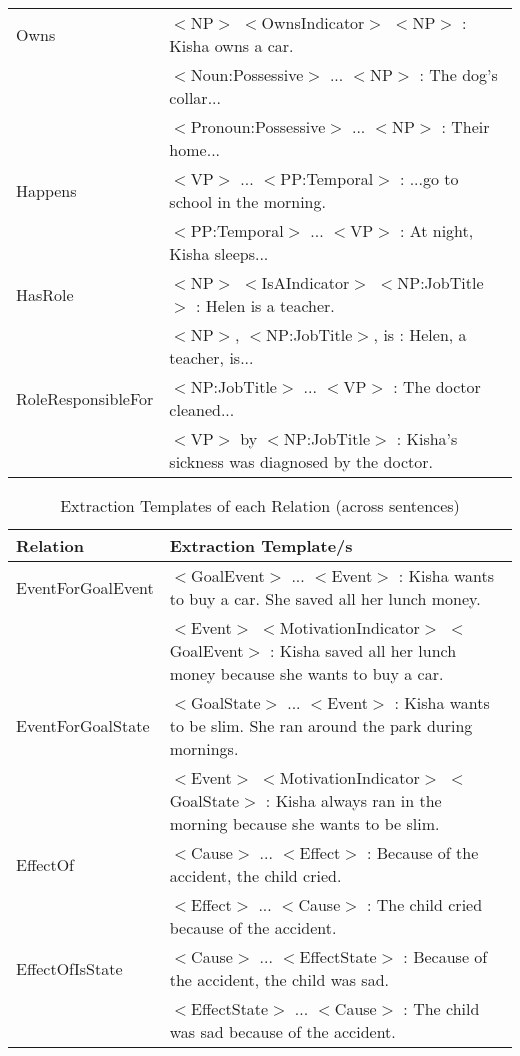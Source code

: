 \begin{table}[H]
\begin{tabular}{|p{3.5cm}|p{10cm}|}
Owns				& $<$NP$>$ $<$OwnsIndicator$>$ $<$NP$>$ : Kisha owns a car. \\
					& $<$Noun:Possessive$>$ ... $<$NP$>$ : The dog's collar... \\
					& $<$Pronoun:Possessive$>$ ... $<$NP$>$ : Their home... \\ \hline
Happens				& $<$VP$>$ ... $<$PP:Temporal$>$ : ...go to school in the morning. \\
					& $<$PP:Temporal$>$ ... $<$VP$>$ : At night, Kisha sleeps... \\ \hline
HasRole				& $<$NP$>$ $<$IsAIndicator$>$ $<$NP:JobTitle$>$ : Helen is a teacher. \\
					& $<$NP$>$, $<$NP:JobTitle$>$, is : Helen, a teacher, is... \\ \hline
RoleResponsibleFor	& $<$NP:JobTitle$>$ ... $<$VP$>$ : The doctor cleaned... \\
					& $<$VP$>$ by $<$NP:JobTitle$>$ : Kisha's sickness was diagnosed by the doctor. \\ \hline
\end{tabular}
\label{tab:templates1}
\end{table}

\begin{table}[H]   %
\centering
\caption{Extraction Templates of each Relation (across sentences)} \vspace{0.25em}
\begin{tabular}{|p{3.5cm}|p{10cm}|} \hline
Relation & Extraction Template/s \\ \hline
EventForGoalEvent	& $<$GoalEvent$>$ ... $<$Event$>$ : Kisha wants to buy a car. She saved all her lunch money. \\
					& $<$Event$>$ $<$MotivationIndicator$>$ $<$GoalEvent$>$ : Kisha saved all her lunch money because she wants to buy a car. \\ \hline
EventForGoalState	& $<$GoalState$>$ ... $<$Event$>$ :  Kisha wants to be slim. She ran around the park during mornings. \\
					& $<$Event$>$ $<$MotivationIndicator$>$ $<$GoalState$>$ : Kisha always ran in the morning because she wants to be slim. \\ \hline
EffectOf			& $<$Cause$>$ ... $<$Effect$>$ : Because of the accident, the child cried. \\
					& $<$Effect$>$ ... $<$Cause$>$ : The child cried because of the accident. \\ \hline			
EffectOfIsState		& $<$Cause$>$ ... $<$EffectState$>$ : Because of the accident, the child was sad. \\
					& $<$EffectState$>$ ... $<$Cause$>$ : The child was sad because of the accident. \\ \hline		
\end{tabular}
\label{tab:templates2}
\end{table}

